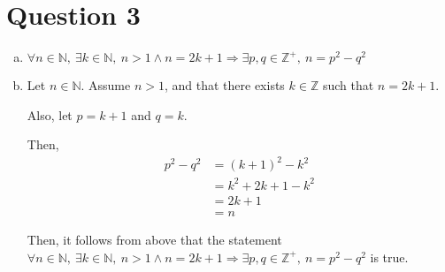 \documentclass[12pt]{article}
\begin{document}
\section*{Question 3}
\begin{enumerate}[a.]
    \item

    $\forall n \in \mathbb{N},\:\exists k \in \mathbb{N},\:n > 1 \land n = 2k + 1 \Rightarrow
    \exists p,q \in \mathbb{Z}^{+},\:n = p^2 - q^2$

    \item

    Let $n \in \mathbb{N}$. Assume $n > 1$, and that there exists $k \in \mathbb{Z}$
    such that $n = 2k + 1$.

    \bigskip

    Also, let $p = k + 1$ and $q = k$.

    \bigskip

    Then,
    \setcounter{equation}{0}
    \begin{align}
        p^2 - q^2 &= (k+1)^2 - k^2\\
        &= k^2 + 2k + 1 - k^2\\
        &= 2k + 1\\
        &= n
    \end{align}

    Then, it follows from above that the statement  $\forall n \in \mathbb{N},\:
    \exists k \in \mathbb{N},\:n > 1 \land n = 2k + 1 \Rightarrow \exists p,q \in
    \mathbb{Z}^{+},\:n = p^2 - q^2$ is true.

\end{enumerate}
\end{document}
